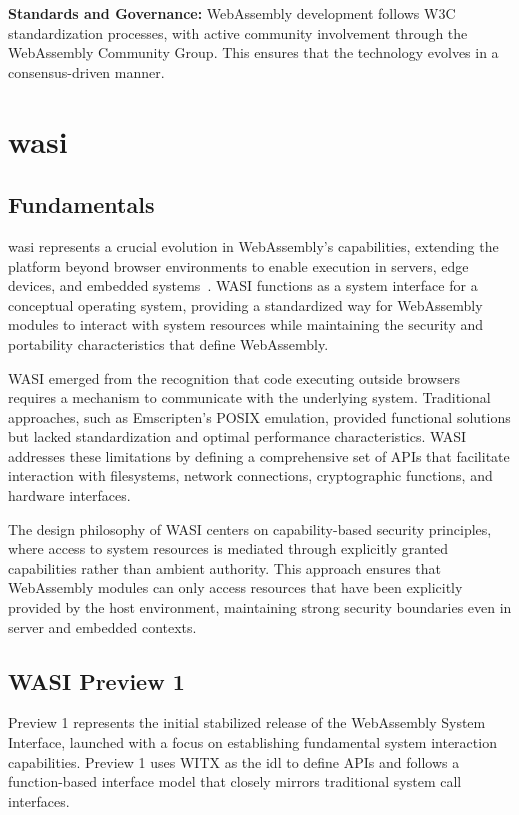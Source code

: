 \textbf{Standards and Governance:} WebAssembly development follows W3C standardization processes, with active community involvement through the WebAssembly Community Group. This ensures that the technology evolves in a consensus-driven manner.

\section{\acrfull{wasi}}
\label{sec:wasi}

\subsection{Fundamentals}
\label{subsec:wasi-fundamentals}

\acrshort{wasi} represents a crucial evolution in WebAssembly's capabilities, extending the platform beyond browser environments to enable execution in servers, edge devices, and embedded systems~\cite{wasi_mozilla_blog}. WASI functions as a system interface for a conceptual operating system, providing a standardized way for WebAssembly modules to interact with system resources while maintaining the security and portability characteristics that define WebAssembly.

WASI emerged from the recognition that code executing outside browsers requires a mechanism to communicate with the underlying system. Traditional approaches, such as Emscripten's POSIX emulation, provided functional solutions but lacked standardization and optimal performance characteristics. WASI addresses these limitations by defining a comprehensive set of APIs that facilitate interaction with filesystems, network connections, cryptographic functions, and hardware interfaces.

The design philosophy of WASI centers on capability-based security principles, where access to system resources is mediated through explicitly granted capabilities rather than ambient authority. This approach ensures that WebAssembly modules can only access resources that have been explicitly provided by the host environment, maintaining strong security boundaries even in server and embedded contexts.

\subsection{WASI Preview 1}
\label{subsec:wasi-preview1}

Preview 1 represents the initial stabilized release of the WebAssembly System Interface, launched with a focus on establishing fundamental system interaction capabilities. Preview 1 uses WITX as the \acrfull{idl} to define APIs and follows a function-based interface model that closely mirrors traditional system call interfaces.

